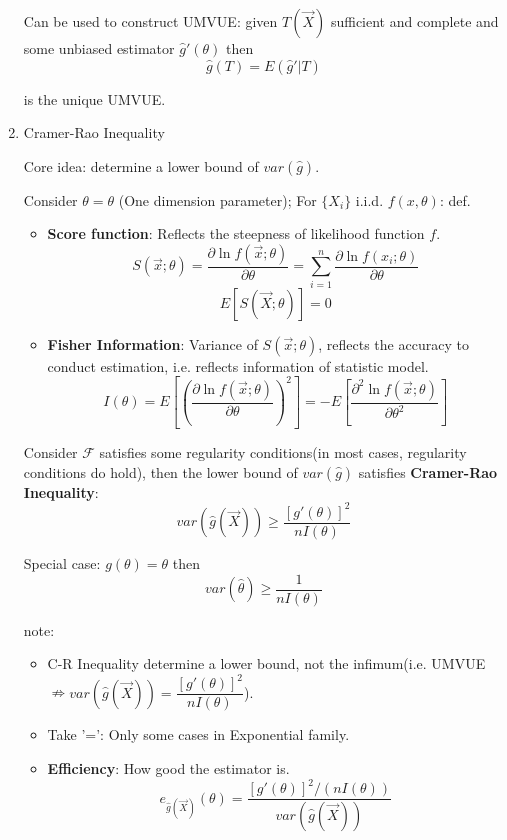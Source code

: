 \begin{enumerate}
    Can be used to construct UMVUE: given $T(\vec{X})$ sufficient and complete and some unbiased estimator $\hat{g}\prime(\theta)$ then 
    \[
        \hat{g}(T)=E(\hat{g}\prime|T)    
    \]

    is the unique UMVUE.



\item Cramer-Rao Inequality

    Core idea: determine a lower bound of $var(\hat{g})$.

    Consider $\theta=\theta$ (One dimension parameter); For $\{X_i\}$ i.i.d. $f(x,\theta)$: def.
    \begin{itemize}
        \item \textbf{Score function}: Reflects the steepness of likelihood function $f$.
        \[
            S(\vec{x};\theta)=\frac{\partial\ln f(\vec{x};\theta)}{\partial\theta}=\sum_{i=1}^n\frac{\partial\ln f(x_i;\theta)}{\partial\theta}
        \]
        \[E[S(\vec{X};\theta)]=0\]
        \item \textbf{Fisher Information}: Variance of $S(\vec{x};\theta)$, reflects the accuracy to conduct estimation, i.e. reflects information of statistic model.
        \[
            I(\theta)=E\left[\left(\frac{\partial \ln f(\vec{x};\theta)}{\partial\theta}\right)^2\right]=-E\left[\frac{\partial^2\ln f(\vec{x};\theta)}{\partial \theta^2}\right]
        \]
    \end{itemize}

    Consider $\mathscr{F}$ satisfies some regularity conditions(in most cases, regularity conditions do  hold), then the lower bound of $var(\hat{g})$ satisfies \textbf{Cramer-Rao Inequality}:
    \[
        var(\hat{g}(\vec{X}))\geq\frac{[g'(\theta)]^2}{nI(\theta)}
    \]

    Special case: $g(\theta)=\theta$ then
    \[
        var(\hat{\theta})\geq\frac{1}{nI(\theta)}    
    \]

    note:
    \begin{itemize}
        \item C-R Inequality determine a lower bound, not the infimum(i.e. UMVUE$\nRightarrow var(\hat{g}(\vec{X}))=\dfrac{[g'(\theta)]^2}{nI(\theta)}$).
        \item Take '=': Only some cases in Exponential family.
        \item \textbf{Efficiency}: How good the estimator is.
        \[
            e_{\hat{g}(\vec{X})}(\theta)=   \frac{[g'(\theta)]^2/(nI(\theta))}{var(\hat{g}(\vec{X}))} 
        \] 
    \end{itemize}



\end{enumerate}
